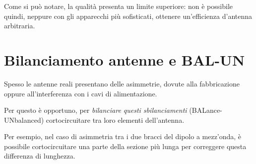 Come si può notare, la qualità presenta un limite superiore: non è possibile quindi, neppure con gli apparecchi più sofisticati, ottenere un'efficienza d'antenna arbitraria.

\section{Bilanciamento antenne e BAL-UN}

Spesso le antenne reali presentano delle asimmetrie, dovute alla fabbricazione oppure all'interferenza con i cavi di alimentazione.

Per questo è opportuno, per \emph{bilanciare questi sbilanciamenti} (BALance-UNbalanced) cortocircuitare tra loro elementi dell'antenna.

Per esempio, nel caso di asimmetria tra i due bracci del dipolo a mezz'onda, è possibile cortocircuitare una parte della sezione più lunga per correggere questa differenza di lunghezza.

